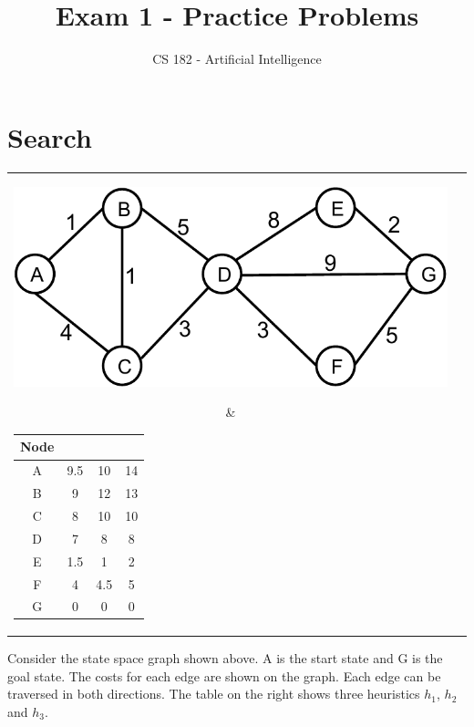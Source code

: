 \documentclass[a4paper]{article}
\title{Exam 1 - Practice Problems}
\author{CS 182 - Artificial Intelligence}
\begin{document}
\maketitle

\section{Search}

\begin{center}
\begin{tabular}{cc}
\parbox[c]{10cm}{\includegraphics[width =0.75\linewidth]{figs/search_graph.pdf} }
&
\begin{tabular}[h]{|c|c|c|c|}
\hline
Node &$h_1$ 	&	$h_2$ & $h_3$ \\
\hline
A 	& 	9.5 	&	10 & 14\\
B 	&	9	&	12	   & 13  \\
C 	&	8	&	10	   & 10   \\
D 	&	7	&	8	   & 8   \\
E 	&	1.5	&	1	   & 2 \\
F 	&	4	&	4.5	   & 5   \\
G 	&	0	&	0	   & 0   \\
\hline 
\end{tabular}
\end{tabular}
\end{center}

Consider the state space graph shown above.  A is the start state and
G is the goal state. The costs for each edge are shown on the graph.  Each edge can
be traversed in both directions. The table on the right shows three heuristics $h_1$, $h_2$ and $h_3$. 
\end{document}
